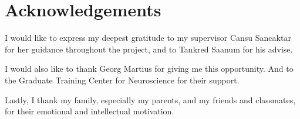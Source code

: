 \chapter*{Acknowledgements}

I would like to express my deepest gratitude to my supervisor Cansu Sancaktar for her guidance throughout the project, and to Tankred Saanum for his advise.\\\vspace{-12pt}

I would also like to thank Georg Martius for giving me this opportunity. And to the Graduate Training Center for Neuroscience for their support.\\\vspace{-12pt}

Lastly, I thank my family, especially my parents, and my friends and classmates, for their emotional and intellectual motivation.
